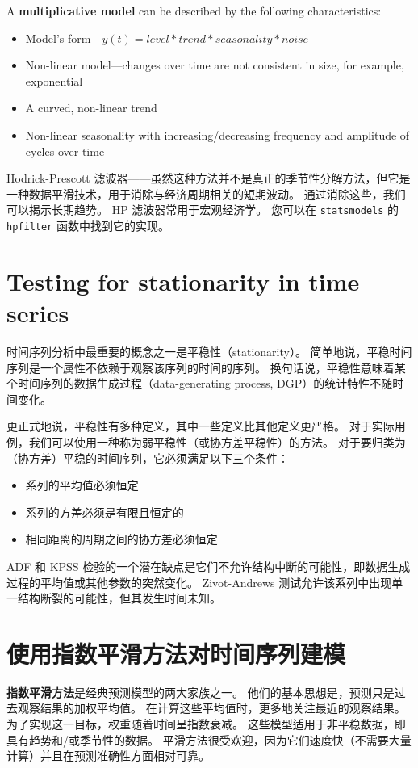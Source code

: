 A \textbf{multiplicative model} can be described by the following characteristics:
\begin{itemize}
    \item Model's form—$y(t) = level * trend * seasonality * noise$
    \item Non-linear model—changes over time are not consistent in size, for example, exponential
    \item A curved, non-linear trend
    \item Non-linear seasonality with increasing/decreasing frequency and amplitude of cycles over time
\end{itemize}

Hodrick-Prescott 滤波器——虽然这种方法并不是真正的季节性分解方法，但它是一种数据平滑技术，用于消除与经济周期相关的短期波动。 通过消除这些，我们可以揭示长期趋势。 HP 滤波器常用于宏观经济学。 您可以在 \verb|statsmodels| 的 \verb|hpfilter| 函数中找到它的实现。

\section{Testing for stationarity in time series}
时间序列分析中最重要的概念之一是平稳性（stationarity）。 简单地说，平稳时间序列是一个属性不依赖于观察该序列的时间的序列。 换句话说，平稳性意味着某个时间序列的数据生成过程（data-generating process, DGP）的统计特性不随时间变化。

更正式地说，平稳性有多种定义，其中一些定义比其他定义更严格。 对于实际用例，我们可以使用一种称为弱平稳性（或协方差平稳性）的方法。 对于要归类为（协方差）平稳的时间序列，它必须满足以下三个条件：
\begin{itemize}
    \item 系列的平均值必须恒定
    \item 系列的方差必须是有限且恒定的
    \item 相同距离的周期之间的协方差必须恒定
\end{itemize}

ADF 和 KPSS 检验的一个潜在缺点是它们不允许结构中断的可能性，即数据生成过程的平均值或其他参数的突然变化。 Zivot-Andrews 测试允许该系列中出现单一结构断裂的可能性，但其发生时间未知。
\section{使用指数平滑方法对时间序列建模}

\textbf{指数平滑方法}是经典预测模型的两大家族之一。 他们的基本思想是，预测只是过去观察结果的加权平均值。 在计算这些平均值时，更多地关注最近的观察结果。 为了实现这一目标，权重随着时间呈指数衰减。 这些模型适用于非平稳数据，即具有趋势和/或季节性的数据。 平滑方法很受欢迎，因为它们速度快（不需要大量计算）并且在预测准确性方面相对可靠。

